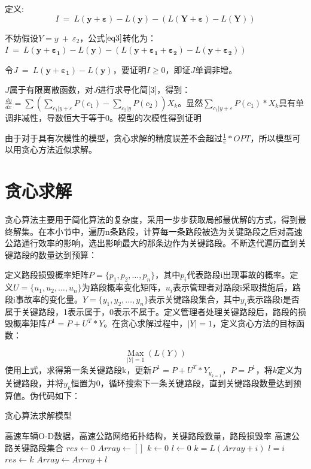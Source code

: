 				定义:
				\begin{equation}
				I\ =\ L(\bm{y+\varepsilon})-L(\bm{y})-(L(\bm{Y+ \varepsilon}) - L(\bm{Y}))
				\label{eq3}
				\end{equation}

				不妨假设$Y = y\ +\ \varepsilon_2$，公式$\ref{eq3}$转化为：$I\ =\ L(\bm{y+\varepsilon_1})-L(\bm{y})-(L(\bm{y+ \varepsilon_1+\varepsilon_2}) - L(\bm{y+\varepsilon_2}))$

				令$J\ =\ L(\bm{y+\varepsilon_1})-L(\bm{y})$，要证明$I \ge 0$，即证$J$单调非增。

				$J$属于有限离散函数，对$J$进行求导化简[3]，得到：$\frac{{dy}}{{dx}} = \sum {(\sum\limits_{{c_1}|y + \varepsilon } {P({c_1})}  - \sum\limits_{{c_2}|y} {P({c_2})} )} {X_k}$。显然${\sum\limits_{{c_1}|y + \varepsilon } {P({c_1})} * X_k}$具有单调非减性，导数恒大于等于0。模型的次模性得到证明

				由于对于具有次模性的模型，贪心求解的精度误差不会超过$\frac{1}{e} * OPT$，所以模型可以用贪心方法近似求解。
		\section{贪心求解}
			贪心算法主要用于简化算法的复杂度，采用一步步获取局部最优解的方式，得到最终解集。在本小节中，遍历n条路段，计算每一条路段被选为关键路段之后对高速公路通行效率的影响，选出影响最大的那条边作为关键路段。不断迭代遍历直到关键路段的数量达到预算：

			定义路段损毁概率矩阵$P=\{p_1,p_2,\dots,p_n\}$，其中$p_i$代表路段i出现事故的概率。定义$U=\{u_1,u_2,\dots,u_n\}$为路段概率变化矩阵，$u_i$表示管理者对路段i采取措施后，路段i事故率的变化量。$Y=\{y_1,y_2,\dots,y_n\}$表示关键路段集合，其中$y_i$表示路段i是否属于关键路段，1表示属于，0表示不属于。定义管理者处理关键路段后，路段的损毁概率矩阵$P^1=P+U^T*Y$。在贪心求解过程中，$|Y|=1$，定义贪心方法的目标函数：

				$$\mathop{Max}\limits_{|Y|=1} (L(Y))$$
			使用上式，求得第一条关键路段k，更新$P^1=P+U^T*Y_{y_{k=1}}$，$P=P^1$，将$k$定义为关键路段，并将$y_k$恒置为0，循环搜索下一条关键路段，直到关键路段数量达到预算值。伪代码如下：

		\begin{algorithm}[h]
        \caption{贪心算法求解模型}  
        \label{tanxin}
        \begin{algorithmic}[1] %
            \Require 高速车辆O-D数据，高速公路网络拓扑结构，关键路段数量，路段损毁率
            \Ensure 高速公路关键路段集合
                \State $res\gets 0$  
                \State $Array\gets []$  
                \State $k\gets 0$  
                \State $l\gets 0$  
                        	\State $k=L(Array+i)$  
                        	\State $l=i$  
                    	\EndIf
                	\EndFor    
                    \State $res\gets k$
                    \State $Array\gets Array+l$
                \EndWhile  
                \State {}  
            \EndFunction  
        \end{algorithmic}  
    	\end{algorithm} 

